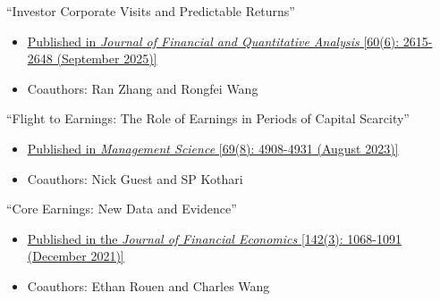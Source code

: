 \pagebreak[0]
\begin{samepage}
\item ``Investor Corporate Visits and Predictable Returns''
\begin{itemize}
\vspace*{-.07in}
	\item \href{https://doi.org/10.1017/S0022109024000528}{Published in {\it Journal of Financial and Quantitative Analysis} [60(6): 2615-2648 (September 2025)]}
	\vspace*{-.07in}
	\item Coauthors: Ran Zhang and Rongfei Wang

\end{itemize}
\end{samepage}
\vskip 0.08cm


\pagebreak[0]
\begin{samepage}
\item ``Flight to Earnings: The Role of Earnings in Periods of Capital Scarcity''
\begin{itemize}
\vspace*{-.07in}
	\item \href{https://doi.org/10.1287/mnsc.2022.4538}{Published in {\it Management Science} [69(8): 4908-4931 (August 2023)]}
	\vspace*{-.07in}
	\item Coauthors: Nick Guest and SP Kothari

\end{itemize}
\end{samepage}
\vskip 0.08cm

\pagebreak[0]
\begin{samepage}
\item ``Core Earnings: New Data and Evidence''
\begin{itemize}
\vspace*{-.07in}
	\item \href{https://doi.org/10.1016/j.jfineco.2021.04.025}{Published in the {\it Journal of Financial Economics} [142(3): 1068-1091 (December 2021)]}
	\vspace*{-.07in}
	\item Coauthors: Ethan Rouen and Charles Wang
\end{itemize}
\end{samepage}


